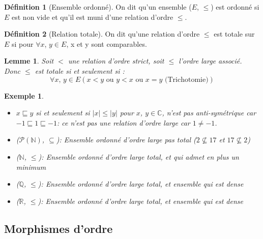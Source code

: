 \documentclass{article}
\theoremstyle{definition}
\newtheorem{definition}{Définition}
\theoremstyle{definition}
\theoremstyle{definition}
\theoremstyle{plain}
\newtheorem{example}{Exemple}
\theoremstyle{theorem}
\theoremstyle{theorem}
\newtheorem{lemma}{Lemme}
\begin{document}
\begin{definition}[Ensemble ordonné]

    On dit qu'un ensemble ($E$, $\leqslant$) est ordonné si $E$ est non vide et qu'il est muni d'une relation d'ordre $\leqslant$.

\end{definition}

\begin{definition}[Relation totale]

    On dit qu'une relation d'ordre $\leqslant$ est totale sur $E$ si pour $\forall x$, $y \in E$, x et y sont comparables.

\end{definition}

\begin{lemma}

    Soit $<$ une relation d'ordre strict, soit $\leqslant$ l'ordre large associé. Donc $\leqslant$ est totale si et seulement si :
	\begin{equation*}
        \forall x \text{, } y \in E (x < y \text{ ou } y < x \text{ ou } x = y \text{ (Trichotomie)})
	\end{equation*}
	\noindent

\end{lemma}

\begin{example}
    \begin{itemize}
        \item $x \sqsubseteq y$ si et seulement si $|x| \leqslant |y|$ pour $x$, $y \in \mathbb{C}$, n'est pas anti-symétrique
            car $-1 \sqsubseteq 1 \sqsubseteq -1$: ce n'est pas une relation d'ordre large car $1 \neq -1$.
        \item ($\mathscr{P}(\mathbb{N})$, $\subseteq$): Ensemble ordonné d'ordre large pas total (${2} \nsubseteq {17}$ et ${17} \nsubseteq {2}$)
        \item ($\mathbb{N}$, $\leqslant$): Ensemble ordonné d'ordre large total, et qui admet en plus un minimum
        \item ($\mathbb{Q}$, $\leqslant$): Ensemble ordonné d'ordre large total, et ensemble qui est dense
        \item ($\mathbb{R}$, $\leqslant$): Ensemble ordonné d'ordre large total, et ensemble qui est dense
    \end{itemize} 
\end{example}

\subsection{Morphismes d'ordre}
\end{document}

